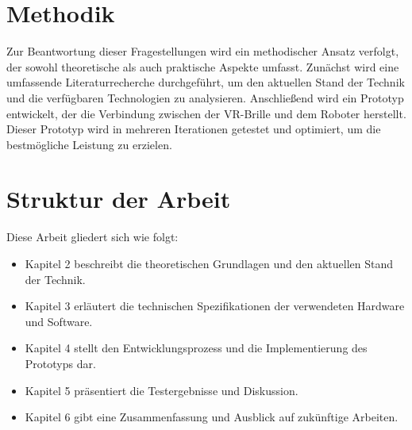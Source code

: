 \section{Methodik}
Zur Beantwortung dieser Fragestellungen wird ein methodischer Ansatz verfolgt, der sowohl theoretische als auch praktische Aspekte umfasst. Zunächst wird eine umfassende Literaturrecherche durchgeführt, um den aktuellen Stand der Technik und die verfügbaren Technologien zu analysieren. Anschließend wird ein Prototyp entwickelt, der die Verbindung zwischen der VR-Brille und dem Roboter herstellt. Dieser Prototyp wird in mehreren Iterationen getestet und optimiert, um die bestmögliche Leistung zu erzielen.

\section{Struktur der Arbeit}
Diese Arbeit gliedert sich wie folgt:
\begin{itemize}
    \item Kapitel 2 beschreibt die theoretischen Grundlagen und den aktuellen Stand der Technik.
    \item Kapitel 3 erläutert die technischen Spezifikationen der verwendeten Hardware und Software.
    \item Kapitel 4 stellt den Entwicklungsprozess und die Implementierung des Prototyps dar.
    \item Kapitel 5 präsentiert die Testergebnisse und Diskussion.
    \item Kapitel 6 gibt eine Zusammenfassung und Ausblick auf zukünftige Arbeiten.
\end{itemize}

